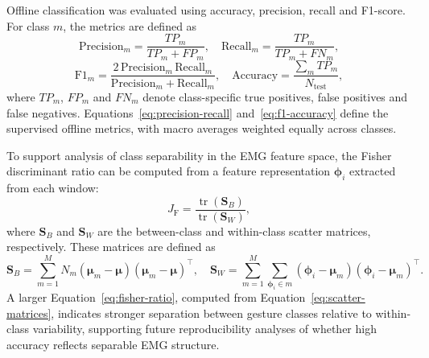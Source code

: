 \documentclass[technologies,article,submit,pdftex,moreauthors]{Definitions/mdpi}
\begin{document}
Offline classification was evaluated using accuracy, precision, recall and F1-score. For class $m$, the metrics are defined as
\begin{equation}
    \label{eq:precision-recall}
    \mathrm{Precision}_m = \frac{TP_m}{TP_m+FP_m},
    \quad
    \mathrm{Recall}_m = \frac{TP_m}{TP_m+FN_m},
\end{equation}
\begin{equation}
    \label{eq:f1-accuracy}
    \mathrm{F1}_m =
    \frac{2\,\mathrm{Precision}_m\,\mathrm{Recall}_m}
    {\mathrm{Precision}_m+\mathrm{Recall}_m},
    \quad
    \mathrm{Accuracy} =
    \frac{\sum_m TP_m}{N_{\mathrm{test}}},
\end{equation}
where $TP_m$, $FP_m$ and $FN_m$ denote class-specific true positives, false positives and false negatives. Equations~\eqref{eq:precision-recall} and~\eqref{eq:f1-accuracy} define the supervised offline metrics, with macro averages weighted equally across classes.

To support analysis of class separability in the EMG feature space, the Fisher discriminant ratio can be computed from a feature representation $\boldsymbol{\phi}_{i}$ extracted from each window:
\begin{equation}
    \label{eq:fisher-ratio}
    J_{\mathrm{F}}
    =
    \frac{\operatorname{tr}(\mathbf{S}_{B})}
    {\operatorname{tr}(\mathbf{S}_{W})},
\end{equation}
where $\mathbf{S}_{B}$ and $\mathbf{S}_{W}$ are the between-class and within-class scatter matrices, respectively. These matrices are defined as
\begin{equation}
    \label{eq:scatter-matrices}
    \mathbf{S}_{B}
    =
    \sum_{m=1}^{M}
    N_m
    (\boldsymbol{\mu}_{m}-\boldsymbol{\mu})
    (\boldsymbol{\mu}_{m}-\boldsymbol{\mu})^{\top},
    \quad
    \mathbf{S}_{W}
    =
    \sum_{m=1}^{M}
    \sum_{\boldsymbol{\phi}_{i}\in m}
    (\boldsymbol{\phi}_{i}-\boldsymbol{\mu}_{m})
    (\boldsymbol{\phi}_{i}-\boldsymbol{\mu}_{m})^{\top}.
\end{equation}
A larger Equation~\eqref{eq:fisher-ratio}, computed from Equation~\eqref{eq:scatter-matrices}, indicates stronger separation between gesture classes relative to within-class variability, supporting future reproducibility analyses of whether high accuracy reflects separable EMG structure.
\end{document}
